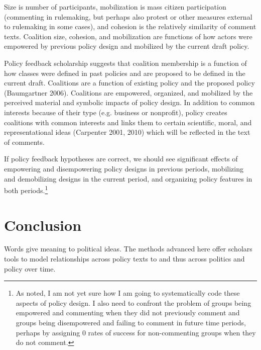 Size is number of participants, mobilization is mass citizen participation (commenting in rulemaking, but perhaps also protest or other measures external to rulemaking in some cases), and cohesion is the relatively similarity of comment texts. Coalition size, cohesion, and mobilization are functions of how actors were empowered by previous policy design and mobilized by the current draft policy. 

Policy feedback scholarship suggests that coalition membership is a function of how classes were defined in past policies and are proposed to be defined in the current draft. Coalitions are a function of existing policy and the proposed policy (Baumgartner 2006). Coalitions are empowered, organized, and mobilized by the perceived material and symbolic impacts of policy design. In addition to common interests because of their type (e.g. business or nonprofit), policy creates coalitions with common interests and links them to certain scientific, moral, and representational ideas (Carpenter 2001, 2010) which will be reflected in the text of comments.%

If policy feedback hypotheses are correct, we should see significant effects of empowering and disempowering policy designs in previous periods, mobilizing and demobilizing designs in the current period, and organizing policy features in both periods.\footnote{As noted, I am not yet sure how I am going to systematically code these aspects of policy design. I also need to confront the problem of groups being empowered and commenting when they did not previously comment and groups being disempowered and failing to comment in future time periods, perhaps by assigning 0 rates of success for non-commenting groups when they do not comment.}

\section{Conclusion}

Words give meaning to political ideas. The methods advanced here offer scholars tools to model relationships across policy texts to and thus across politics and policy over time. 

